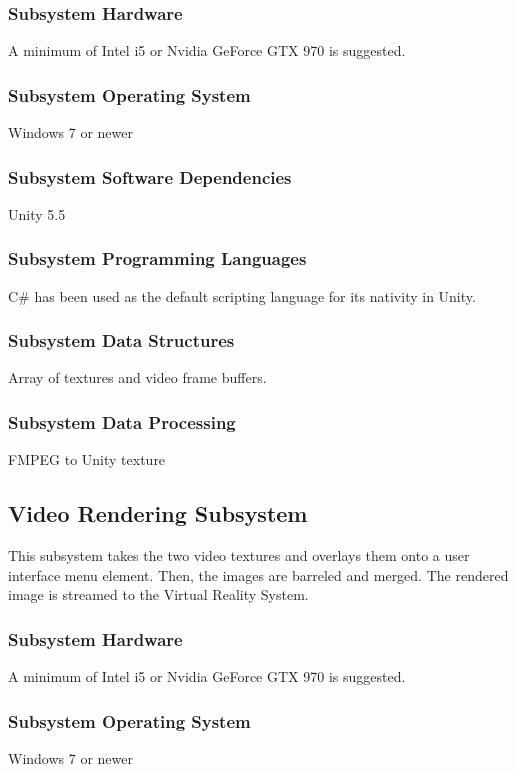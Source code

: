 \subsubsection{Subsystem Hardware}
A minimum of Intel i5 or Nvidia GeForce GTX 970 is suggested.

\subsubsection{Subsystem Operating System}
Windows 7 or newer

\subsubsection{Subsystem Software Dependencies}
Unity 5.5

\subsubsection{Subsystem Programming Languages}
C\# has been used as the default scripting language for its nativity in Unity.

\subsubsection{Subsystem Data Structures}
Array of textures and video frame buffers.

\subsubsection{Subsystem Data Processing}
FMPEG to Unity texture

\subsection{Video Rendering Subsystem}
This subsystem takes the two video textures and overlays them onto a user interface menu element. Then, the images are barreled and merged. The rendered image is streamed to the Virtual Reality System.

\subsubsection{Subsystem Hardware}
A minimum of Intel i5 or Nvidia GeForce GTX 970 is suggested.

\subsubsection{Subsystem Operating System}
Windows 7 or newer

